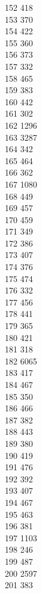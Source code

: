 { 152	418 \\
 153	370 \\
 154	422 \\
 155	360 \\
 156	373 \\
 157	332 \\
 158	465 \\
 159	383 \\
 160	442 \\
 161	302 \\
 162	1296 \\
 163	3287 \\
 164	342 \\
 165	464 \\
 166	362 \\
 167	1080 \\
 168	449 \\
 169	457 \\
 170	459 \\
 171	349 \\
 172	386 \\
 173	407 \\
 174	376 \\
 175	474 \\
 176	332 \\
 177	456 \\
 178	441 \\
 179	365 \\
 180	421 \\
 181	318 \\
 182	6065 \\
 183	417 \\
 184	467 \\
 185	350 \\
 186	466 \\
 187	382 \\
 188	443 \\
 189	380 \\
 190	419 \\
 191	476 \\
 192	392 \\
 193	407 \\
 194	467 \\
 195	463 \\
 196	381 \\
 197	1103 \\
 198	246 \\
 199	487 \\
 200	2597 \\
 201	383 \\
}
